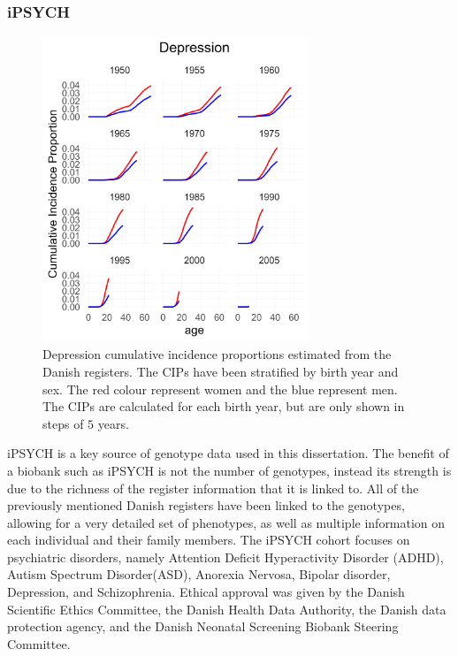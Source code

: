 \subsubsection{iPSYCH}
\begin{figure}
	\includegraphics[width=8cm]{methods/prevalencePlot_DEP.png}
	\caption[Cumulative incidence proportions from the Danish 
	Registers]{Depression cumulative incidence proportions estimated from the 
		Danish registers. The CIPs have been stratified by birth year and sex. The 
		red colour represent women and the blue represent men. The CIPs are 
		calculated for each birth year, but are only shown in steps of $ 
		5 $ years.}
	\label{fig:CIP_DEP}
\end{figure}
iPSYCH is a key source of genotype data used in this dissertation. The benefit of a biobank such as iPSYCH is not the number of genotypes, instead its strength is due to the richness of the register information that it is linked to. All of the previously mentioned Danish registers have been linked to the genotypes, allowing for a very detailed set of phenotypes, as well as multiple information on each individual and their family members. The iPSYCH cohort focuses on psychiatric disorders, namely Attention Deficit Hyperactivity Disorder (ADHD), Autism Spectrum Disorder(ASD), Anorexia Nervosa, Bipolar disorder, Depression, and Schizophrenia\cite{pedersen2018ipsych2012}. Ethical approval was given by the Danish Scientific Ethics Committee, the Danish Health Data Authority, the Danish data protection agency, and the Danish Neonatal Screening Biobank Steering Committee.

